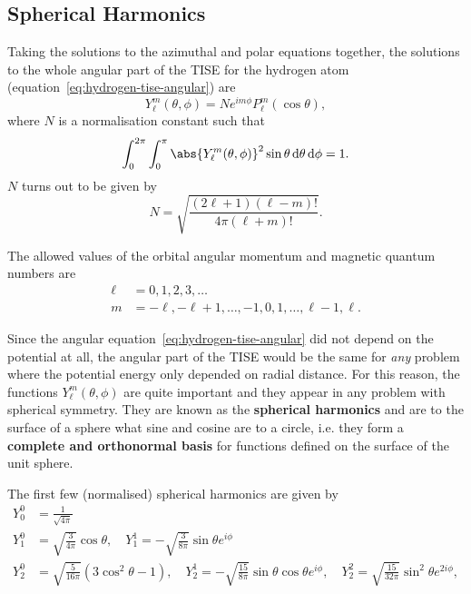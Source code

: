 \documentclass[../quantum_mechanics.tex]{subfiles}
\begin{document}
        \subsection{Spherical Harmonics}\label{sec:solving-the-hydrogen-atom:subsec:spherical-harmonics}
            Taking the solutions to the azimuthal and polar equations together, the solutions to the whole angular part of the TISE for the hydrogen atom (equation~\ref{eq:hydrogen-tise-angular}) are
            \begin{equation}
                Y_\ell^m(\theta,\phi)=Ne^{im\phi}P_\ell^m(\cos\theta),
            \end{equation}
            where $N$ is a normalisation constant such that
            \begin{equation}
                \int_0^{2\pi}\int_0^\pi\abs{Y_\ell^m(\theta,\phi)}^2\sin\theta\dd{\theta}\dd{\phi}=1.
            \end{equation}
            $N$ turns out to be given by
            \begin{equation}
                N=\sqrt{\frac{(2\ell+1)(\ell-m)!}{4\pi(\ell+m)!}}.
            \end{equation}

            The allowed values of the orbital angular momentum and magnetic quantum numbers are
            \begin{align}
                \ell&=0,1,2,3,\dots\\
                m&=-\ell,-\ell+1,\dots,-1,0,1,\dots,\ell-1,\ell.
            \end{align}

            Since the angular equation~\ref{eq:hydrogen-tise-angular} did not depend on the potential at all, the angular part of the TISE would be the same for \textit{any} problem where the potential energy only depended on radial distance.
            For this reason, the functions $Y_\ell^m(\theta,\phi)$ are quite important and they appear in any problem with spherical symmetry.
            They are known as the \textbf{spherical harmonics} and are to the surface of a sphere what sine and cosine are to a circle, i.e. they form a \textbf{complete and orthonormal basis} for functions defined on the surface of the unit sphere.

            The first few (normalised) spherical harmonics are given by
            \begin{align}
                Y_0^0&=\frac{1}{\sqrt{4\pi}}\\
                Y_1^0&=\sqrt{\frac{3}{4\pi}}\cos\theta,\quad Y_1^1=-\sqrt{\frac{3}{8\pi}}\sin\theta e^{i\phi}\\
                Y_2^0&=\sqrt{\frac{5}{16\pi}}(3\cos^2\theta-1),\quad Y_2^1=-\sqrt{\frac{15}{8\pi}}\sin\theta\cos\theta e^{i\phi},\quad Y_2^2=\sqrt{\frac{15}{32\pi}}\sin^2\theta e^{2i\phi},
            \end{align}
            
\end{document}
